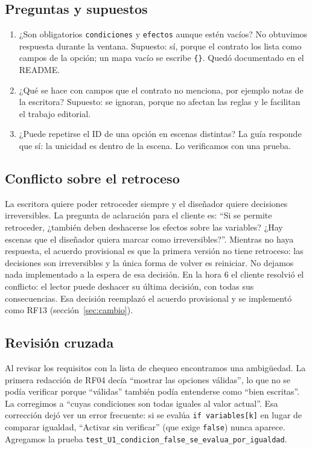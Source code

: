 \documentclass[11pt,letterpaper]{article}
\newcommand{\cod}[1]{\texttt{#1}}
\begin{document}
\subsection{Preguntas y supuestos}
\begin{enumerate}[label=P\arabic*.]
  \item ¿Son obligatorios \cod{condiciones} y \cod{efectos} aunque estén vacíos? No obtuvimos respuesta durante la ventana. Supuesto: sí, porque el contrato los lista como campos de la opción; un mapa vacío se escribe \cod{\{\}}. Quedó documentado en el README.
  \item ¿Qué se hace con campos que el contrato no menciona, por ejemplo notas de la escritora? Supuesto: se ignoran, porque no afectan las reglas y le facilitan el trabajo editorial.
  \item ¿Puede repetirse el ID de una opción en escenas distintas? La guía responde que sí: la unicidad es dentro de la escena. Lo verificamos con una prueba.
\end{enumerate}

\subsection{Conflicto sobre el retroceso}\label{sec:retroceso}
La escritora quiere poder retroceder siempre y el diseñador quiere decisiones irreversibles. La pregunta de aclaración para el cliente es: ``Si se permite retroceder, ¿también deben deshacerse los efectos sobre las variables? ¿Hay escenas que el diseñador quiera marcar como irreversibles?''. Mientras no haya respuesta, el acuerdo provisional es que la primera versión no tiene retroceso: las decisiones son irreversibles y la única forma de volver es reiniciar. No dejamos nada implementado a la espera de esa decisión. En la hora 6 el cliente resolvió el conflicto: el lector puede deshacer su última decisión, con todas sus consecuencias. Esa decisión reemplazó el acuerdo provisional y se implementó como RF13 (sección~\ref{sec:cambio}).

\subsection{Revisión cruzada}
Al revisar los requisitos con la lista de chequeo encontramos una ambigüedad. La primera redacción de RF04 decía ``mostrar las opciones válidas'', lo que no se podía verificar porque ``válidas'' también podía entenderse como ``bien escritas''. La corregimos a ``cuyas condiciones son todas iguales al valor actual''. Esa corrección dejó ver un error frecuente: si se evalúa \cod{if variables[k]} en lugar de comparar igualdad, ``Activar sin verificar'' (que exige \cod{false}) nunca aparece. Agregamos la prueba \cod{test\_U1\_condicion\_false\_se\_evalua\_por\_igualdad}.
\end{document}

